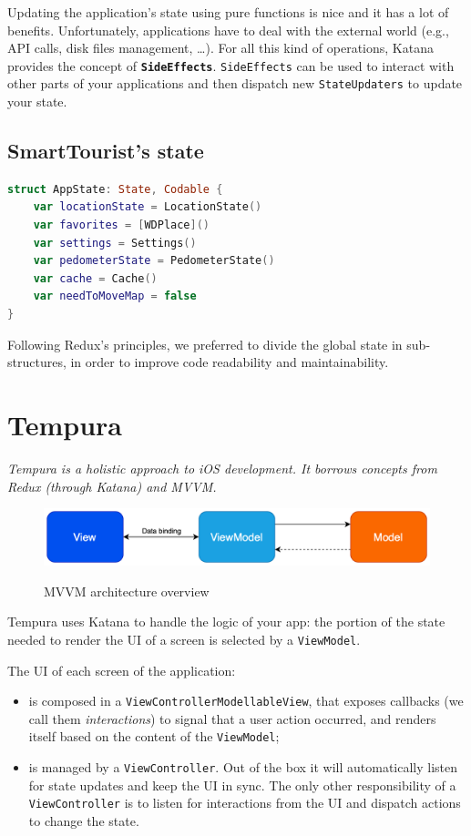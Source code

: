 \documentclass[a4paper, 11pt, parskip=half]{scrreprt}
\theoremstyle{definition}
\newenvironment{linedquote}{
	\begin{mdframed}[style=linedquote]
}{
	\end{mdframed}
}
\begin{document}
Updating the application's state using pure functions is nice and it has a lot of benefits. Unfortunately, applications have to deal with the external world (e.g., API calls, disk files management, …). For all this kind of operations, Katana provides the concept of \textbf{\texttt{SideEffects}}. \texttt{SideEffects} can be used to interact with other parts of your applications and then dispatch new \texttt{StateUpdaters} to update your state.

\subsection{SmartTourist's state}
		
\begin{lstlisting}[language=swift]
struct AppState: State, Codable {
	var locationState = LocationState()
	var favorites = [WDPlace]()
	var settings = Settings()
	var pedometerState = PedometerState()
	var cache = Cache()
	var needToMoveMap = false
}
\end{lstlisting}

Following Redux's principles, we preferred to divide the global state in sub-structures, in order to improve code readability and maintainability.

\newpage
\section{Tempura}

\begin{linedquote}
    \textit{Tempura is a holistic approach to iOS development. It borrows concepts from Redux (through Katana) and MVVM.}
\end{linedquote}

\begin{figure}[H]
  	\centering
  	\includegraphics[width=0.85\linewidth]{MVVM-light}
  	\label{fig:test1}
	\caption{MVVM architecture overview}
\end{figure}

Tempura uses Katana to handle the logic of your app: the portion of the state needed to render the UI of a screen is selected by a \texttt{ViewModel}.

The UI of each screen of the application:
\begin{itemize}
	\item is composed in a \texttt{ViewControllerModellableView}, that exposes callbacks (we call them \textit{interactions}) to signal that a user action occurred, and renders itself based on the content of the \texttt{ViewModel};
	\item is managed by a \texttt{ViewController}. Out of the box it will automatically listen for state updates and keep the UI in sync. The only other responsibility of a \texttt{ViewController} is to listen for interactions from the UI and dispatch actions to change the state.
\end{itemize}
\end{document}
